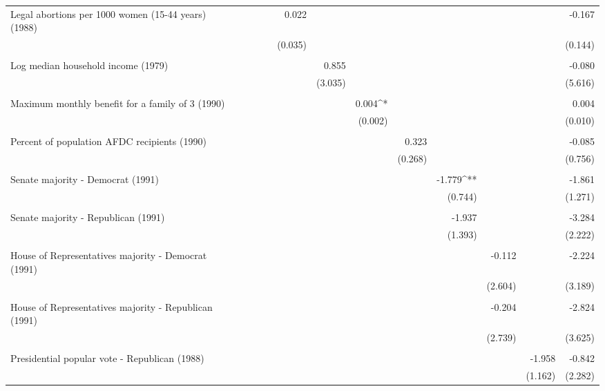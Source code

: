 \begin{table}[!htbp]
\begin{tabular}{@{\extracolsep{5pt}}lD{.}{.}{-3} D{.}{.}{-3} D{.}{.}{-3} D{.}{.}{-3} D{.}{.}{-3} D{.}{.}{-3} D{.}{.}{-3} D{.}{.}{-3} D{.}{.}{-3} D{.}{.}{-3} D{.}{.}{-3} D{.}{.}{-3} }
 Legal abortions per 1000 women (15-44 years) (1988) &  &  &  &  & 0.022 &  &  &  &  &  &  & -0.167 \\ 
  &  &  &  &  & (0.035) &  &  &  &  &  &  & (0.144) \\ 
  & & & & & & & & & & & & \\ 
 Log median household income (1979) &  &  &  &  &  & 0.855 &  &  &  &  &  & -0.080 \\ 
  &  &  &  &  &  & (3.035) &  &  &  &  &  & (5.616) \\ 
  & & & & & & & & & & & & \\ 
 Maximum monthly benefit for a family of 3 (1990) &  &  &  &  &  &  & 0.004^{*} &  &  &  &  & 0.004 \\ 
  &  &  &  &  &  &  & (0.002) &  &  &  &  & (0.010) \\ 
  & & & & & & & & & & & & \\ 
 Percent of population AFDC recipients (1990) &  &  &  &  &  &  &  & 0.323 &  &  &  & -0.085 \\ 
  &  &  &  &  &  &  &  & (0.268) &  &  &  & (0.756) \\ 
  & & & & & & & & & & & & \\ 
 Senate majority - Democrat (1991) &  &  &  &  &  &  &  &  & -1.779^{**} &  &  & -1.861 \\ 
  &  &  &  &  &  &  &  &  & (0.744) &  &  & (1.271) \\ 
  & & & & & & & & & & & & \\ 
 Senate majority - Republican (1991) &  &  &  &  &  &  &  &  & -1.937 &  &  & -3.284 \\ 
  &  &  &  &  &  &  &  &  & (1.393) &  &  & (2.222) \\ 
  & & & & & & & & & & & & \\ 
 House of Representatives majority - Democrat (1991) &  &  &  &  &  &  &  &  &  & -0.112 &  & -2.224 \\ 
  &  &  &  &  &  &  &  &  &  & (2.604) &  & (3.189) \\ 
  & & & & & & & & & & & & \\ 
 House of Representatives majority - Republican (1991) &  &  &  &  &  &  &  &  &  & -0.204 &  & -2.824 \\ 
  &  &  &  &  &  &  &  &  &  & (2.739) &  & (3.625) \\ 
  & & & & & & & & & & & & \\ 
 Presidential popular vote - Republican (1988) &  &  &  &  &  &  &  &  &  &  & -1.958 & -0.842 \\ 
  &  &  &  &  &  &  &  &  &  &  & (1.162) & (2.282) \\ 

\end{tabular}
\end{table}

